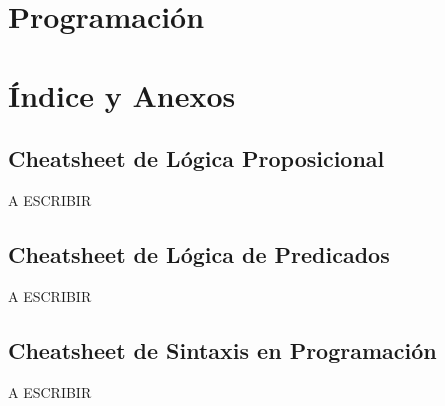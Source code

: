 \documentclass[11pt,fleqn]{book} %
\begin{document}
%
%


\part{Programación}
\label{Programación}

%
%


\part{Índice y Anexos}
\label{Índice y anexos@Indice y Anexos}

\cleardoublepage
{}
\setlength{\columnsep}{0.75cm}
\printindex

\appendix
\appendixpage
\noappendicestocpagenum
\addappheadtotoc




\chapter{Cheatsheet de Lógica Proposicional}
\label{Cheatsheet de Lógica Proposicional}

A ESCRIBIR

\chapter{Cheatsheet de Lógica de Predicados}
\label{Cheatsheet de Lógica de Predicados}

A ESCRIBIR

\chapter{Cheatsheet de Sintaxis en Programación}
\label{Cheatsheet de Sintaxis en Programación}

A ESCRIBIR
\end{document}

